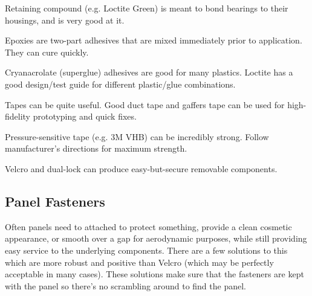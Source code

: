 \documentclass[10pt,letterpaper]{book}
\begin{document}
	\begin{asparaenum}[a)]
		\item Retaining compound (e.g. Loctite Green) is meant to bond bearings to their housings, and is very good at it.
		\item Epoxies are two-part adhesives that are mixed immediately prior to application. They can cure quickly.
		\item Cryanacrolate (superglue) adhesives are good for many plastics. Loctite has a good design/test guide for different plastic/glue combinations.
		\item Tapes can be quite useful. Good duct tape and gaffers tape can be used for high-fidelity prototyping and quick fixes.
		\item Pressure-sensitive tape (e.g. 3M VHB) can be incredibly strong. Follow manufacturer's directions for maximum strength.
		\item Velcro and dual-lock can produce easy-but-secure removable components.
	\end{asparaenum}
	
	
	\subsection{Panel Fasteners}
	
	Often panels need to attached to protect something, provide a clean cosmetic appearance, or smooth over a gap for aerodynamic purposes, while still providing easy service to the underlying components. There are a few solutions to this which are more robust and positive than Velcro (which may be perfectly acceptable in many cases). These solutions make sure that the fasteners are kept with the panel so there's no scrambling around to find the panel.
	
\end{document}
